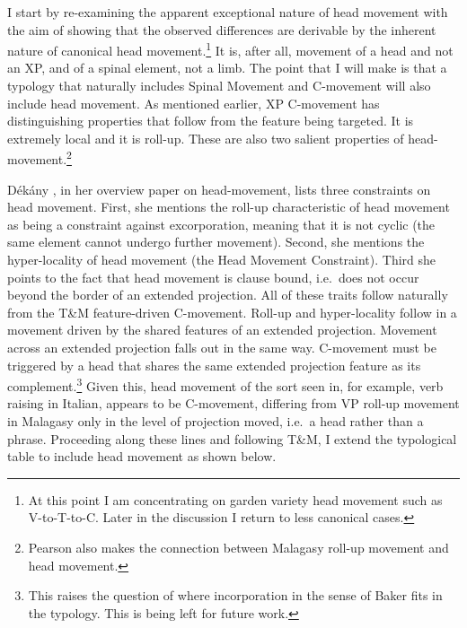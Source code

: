 \documentclass[output=paper,colorlinks,citecolor=brown,
]{langscibook}
\begin{document}
I start by re-examining the apparent exceptional nature of head movement with the aim of showing that the observed differences are derivable by the inherent nature of canonical head movement.\footnote{At this point I am concentrating on garden variety head movement such as V-to-T-to-C.  Later in the discussion I  return to less canonical cases.}  It is, after all, movement of a head and not an XP, and of a spinal element, not a limb.   The point that I will make is that a typology that naturally includes Spinal Movement and C-movement will also include head movement. As mentioned earlier, XP C-movement has distinguishing properties that follow from the feature being targeted.  It is extremely local and it is roll-up.  These are also two salient properties of head-movement.\footnote{Pearson \citeyearpar{Pearson:2000} also makes the connection between Malagasy roll-up movement and head movement.}  

D\'ek\'any \citeyearpar{Dekany:2018}, in her overview paper on head-movement, lists three constraints on head movement.  First,  she mentions the roll-up characteristic of head movement as being a constraint against excorporation, meaning that it is not cyclic (the same element cannot undergo further movement).   Second, she mentions the hyper-locality of head movement (the Head Movement Constraint).  Third she points to the fact that head movement is clause bound, i.e.\ does not occur beyond the border of an extended projection.  All of these traits follow naturally from the T\&M feature-driven C-movement.  Roll-up and hyper-locality follow in a movement driven by the shared features of an extended projection.  Movement across an extended projection  falls out in the same way.  C-movement must be triggered by a head that shares the same extended projection feature as its complement.\footnote{This raises the question of where incorporation in the sense of Baker \citeyearpar{Baker:1988c} fits in the typology.  This is being left for future work.}  Given this, head movement of the sort seen in, for example, verb raising in Italian, appears to be C-movement, differing from VP roll-up movement in Malagasy only in the level of projection moved, i.e.\ a head rather than a phrase.  Proceeding along these lines and following T\&M, I extend the typological table to include head movement as shown below.
\end{document}
